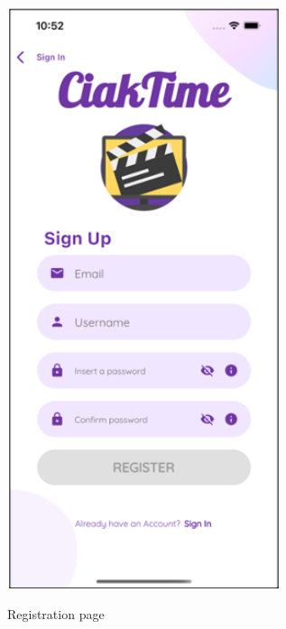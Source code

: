 \documentclass[12pt, a4paper]{article}
\numberwithin{figure}{section}
\begin{document}
\begin{center}
	\begin{minipage}[t]{0.31\textwidth}
		\begin{figure}[H]
			\centering
			\includegraphics[width=0.71\textwidth]{images/prototype2/registration.png}\\
			\caption{Registration page}
		\end{figure}
	\end{minipage}
	\hspace{0.015\linewidth}
	\begin{minipage}[t]{0.31\textwidth}
		\begin{figure}[H]
			\centering

\end{figure}
\end{minipage}
\end{center}
\end{document}

